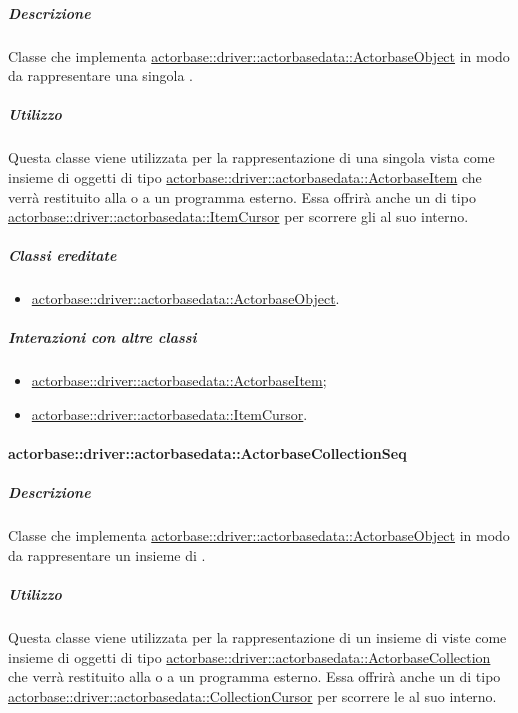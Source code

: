 \documentclass{scalatekids-article}
\begin{document}
\subparagraph{Descrizione}

Classe che implementa \hyperref[sec:actorbase::driver::actorbasedata::ActorbaseObject]{actorbase::driver::actorbasedata::ActorbaseObject}
in modo da rappresentare una singola .

\subparagraph{Utilizzo}

Questa classe viene utilizzata per la rappresentazione di una singola
 vista come insieme di oggetti di tipo
\hyperref[sec:actorbase::driver::actorbasedata::ActorbaseItem]{actorbase::driver::actorbasedata::ActorbaseItem}
che verrà restituito alla  o a un programma esterno.
Essa offrirà anche un  di tipo
\hyperref[sec:actorbase::driver::actorbasedata::ItemCursor]{actorbase::driver::actorbasedata::ItemCursor}
per scorrere gli  al suo interno.

\subparagraph{Classi ereditate}

\begin{itemize}
\item \hyperref[sec:actorbase::driver::actorbasedata::ActorbaseObject]{actorbase::driver::actorbasedata::ActorbaseObject}.
\end{itemize}

\subparagraph{Interazioni con altre classi}

\begin{itemize}
\item \hyperref[sec:actorbase::driver::actorbasedata::ActorbaseItem]{actorbase::driver::actorbasedata::ActorbaseItem};
\item \hyperref[sec:actorbase::driver::actorbasedata::ItemCursor]{actorbase::driver::actorbasedata::ItemCursor}.
\end{itemize}

\paragraph{actorbase::driver::actorbasedata::ActorbaseCollectionSeq}
\label{sec:actorbase::driver::actorbasedata::ActorbaseCollectionSeq}

\subparagraph{Descrizione}

Classe che implementa \hyperref[sec:actorbase::driver::actorbasedata::ActorbaseObject]{actorbase::driver::actorbasedata::ActorbaseObject}
in modo da rappresentare un insieme di .

\subparagraph{Utilizzo}

Questa classe viene utilizzata per la rappresentazione di un insieme di
 viste come insieme di oggetti di tipo
\hyperref[sec:actorbase::driver::actorbasedata::ActorbaseCollection]{actorbase::driver::actorbasedata::ActorbaseCollection}
che verrà restituito alla  o a un programma esterno.
Essa offrirà anche un  di tipo
\hyperref[sec:actorbase::driver::actorbasedata::CollectionCursor]{actorbase::driver::actorbasedata::CollectionCursor}
per scorrere le  al suo interno.
\end{document}
